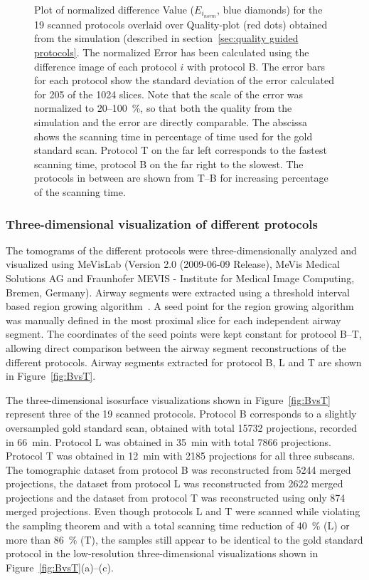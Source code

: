 \begin{figure}
	\centering
	\caption{Plot of normalized difference Value ($E_{i_{norm}}$, blue diamonds) for the 19 scanned protocols overlaid over Quality-plot (red dots) obtained from the simulation (described in section~\ref{sec:quality guided protocols}. The normalized Error has been calculated using the difference image of each protocol $i$ with protocol B. The error bars for each protocol show the standard deviation of the error calculated for 205 of the 1024 slices. Note that the scale of the error was normalized to 20--\SI{100}{\percent}, so that both the quality from the simulation and the error are directly comparable. The abscissa shows the scanning time in percentage of time used for the gold standard scan. Protocol T on the far left corresponds to the fastest scanning time, protocol B on the far right to the slowest. The protocols in between are shown from T--B for increasing percentage of the scanning time.}
	\ifiucr		
		
	\else
	\fi
	\label{fig:NormalizedErrorPlot}
\end{figure}

\subsubsection{Three-dimensional visualization of different protocols}
\label{subsec:comparison}
The tomograms of the different protocols were three-dimensionally analyzed and visualized using MeVisLab (Version 2.0 (2009-06-09 Release), MeVis Medical Solutions AG and Fraunhofer MEVIS - Institute for Medical Image Computing, Bremen, Germany). Airway segments were extracted using a threshold interval based region growing algorithm~\cite{Zucker1976}. A seed point for the region growing algorithm was manually defined in the most proximal slice for each independent airway segment. The coordinates of the seed points were kept constant for protocol B--T, allowing direct comparison between the airway segment reconstructions of the different protocols. Airway segments extracted for protocol B, L and T are shown in Figure~\ref{fig:BvsT}.

The three-dimensional isosurface visualizations shown in Figure~\ref{fig:BvsT} represent three of the 19 scanned protocols. Protocol B corresponds to a slightly oversampled gold standard scan, obtained with total 15732 projections, recorded in \SI{66}{\minute}. Protocol L was obtained in \SI{35}{\minute} with total 7866 projections. Protocol T was obtained in \SI{12}{\minute} with 2185 projections for all three subscans. The tomographic dataset from protocol B was reconstructed from 5244 merged projections, the dataset from protocol L was reconstructed from 2622 merged projections and the dataset from protocol T was reconstructed using only 874 merged projections. Even though protocols L and T were scanned while violating the sampling theorem and with a total scanning time reduction of \SI{40}{\percent} (L) or more than \SI{86}{\percent} (T), the samples still appear to be identical to the gold standard protocol in the low-resolution three-dimensional visualizations shown in Figure~\ref{fig:BvsT}(a)--(c).

